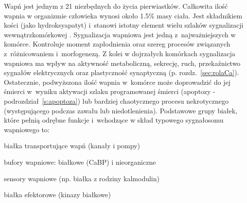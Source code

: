 Wapń jest jednym z 21 niezbędnych do życia pierwiastków. Całkowita ilość wapnia w organizmie człowieka wynosi około 1.5\% masy ciała. Jest składnikiem kości (jako hydroksyapatyt) i~stanowi istotny element wielu szlaków sygnalizacji wewnątrzkomórkowej \cite{Heaney2006}. Sygnalizacja wapniowa jest jedną z~najważniejszych w komórce. Kontroluje moment zapłodnienia oraz szereg procesów związanych z~różnicowaniem i~morfogenezą. Z kolei w dojrzałych komórkach sygnalizacja wapniowa ma wpływ na aktywność metaboliczną, sekrecję, ruch, przekaźnictwo sygnałów elektrycznych oraz plastyczność synaptyczną (p. rozdz.~\ref{sec:rolaCa}). Ostatecznie, podwyższona ilość wapnia w~komórce może doprowadzić do jej śmierci w~wyniku aktywacji szlaku programowanej śmierci (apoptozy - podrozdział~\ref{s:apoptoza}) lub bardziej chaotycznego procesu nekrotycznego (występującego podczas zawału lub niedotlenienia). Podstawowe grupy białek, które pełnią odrębne funkcje i~wchodzące w skład typowego sygnałosomu wapniowego to:\clearpage

\begin{bulletList}
\item białka transportujące wapń (kanały i pompy)
\item bufory wapniowe: białkowe (CaBP) i nieorganiczne %
\item sensory wapniowe (np. białka z rodziny kalmodulin)
\item białka efektorowe (kinazy białkowe)
\end{bulletList}

